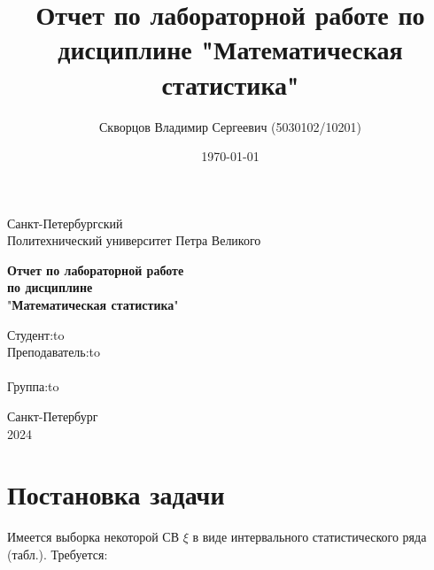 \documentclass[12pt,a4paper]{article}
\title{Отчет по лабораторной работе по дисциплине "Математическая статистика"}
\author{Скворцов Владимир Сергеевич (5030102/10201)}
\date{\today}
\begin{document}
	\begin{titlepage}

		\Large

		\begin{center}
			Санкт-Петербургский \\ Политехнический университет Петра Великого

			\vspace{10em}

			\textbf{Отчет по лабораторной работе} \\
			\textbf{по дисциплине}\\
			"\textbf{Математическая статистика}"

			\vspace{2em}

		\end{center}

		\vspace{6em}

		\newbox{\lbox}
		\newlength{\maxl}
		\setlength{\maxl}{\wd\lbox}
		\hfill\parbox{12cm}{
			\hspace*{3cm}\hspace*{-5cm}Студент:\hfill\hbox to\\
			\hspace*{3cm}\hspace*{-5cm}Преподаватель:\hfill\hbox to\\
			\\
			\hspace*{3cm}\hspace*{-5cm}Группа:\hfill\hbox to\\
		}

		\vspace{\fill}

		\begin{center}
			Санкт-Петербург \\ 2024
		\end{center}

	\end{titlepage}

	\tableofcontents\newpage

	\section{Постановка задачи}

	Имеется выборка некоторой СВ \( \xi \) в виде интервального статистического ряда (табл.). Требуется:
\end{document}
